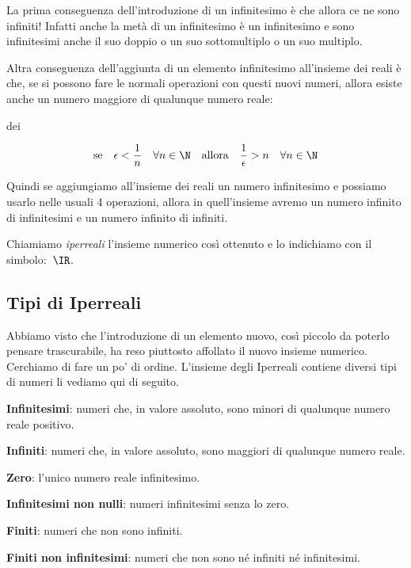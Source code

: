 La prima conseguenza dell'introduzione di un infinitesimo è che allora ce 
ne sono infiniti! 
Infatti anche la metà di un infinitesimo è un infinitesimo e 
sono infinitesimi anche il suo doppio o un suo sottomultiplo o un suo 
multiplo.

Altra conseguenza dell'aggiunta di un elemento infinitesimo all'insieme dei 
reali è che, se si possono fare le normali operazioni con questi nuovi 
numeri, allora esiste anche un numero maggiore di qualunque numero reale:

dei 

\[\text{se} \quad \epsilon < \frac{1}{n} \quad \forall n \in \N 
\quad \text{allora} \quad \frac{1}{\epsilon} > n \quad \forall n 
\in \N\]

Quindi se aggiungiamo all'insieme dei reali un numero infinitesimo e 
possiamo 
usarlo nelle usuali 4 operazioni, allora in quell'insieme avremo un 
numero infinito di infinitesimi e un numero infinito di infiniti.

Chiamiamo \emph{iperreali} l'insieme numerico così ottenuto e lo indichiamo 
con il simbolo:~$\IR$.

\subsection{Tipi di Iperreali}
\label{subsec:insnum_iperreali}

Abbiamo visto che l'introduzione di un elemento nuovo, così piccolo
da poterlo pensare trascurabile, ha reso piuttosto affollato il nuovo 
insieme numerico. 
Cerchiamo di fare un po' di ordine. 
L'insieme degli Iperreali contiene diversi tipi di numeri li vediamo qui di 
seguito.

\begin{description} [noitemsep]
 \item \textbf{Infinitesimi}:
numeri che, in valore assoluto, sono minori di qualunque numero reale 
positivo.
 \item \textbf{Infiniti}:
numeri che, in valore assoluto, sono maggiori di qualunque numero reale.
 \item \textbf{Zero}:
l'unico numero reale infinitesimo.
 \item \textbf{Infinitesimi non nulli}:
numeri infinitesimi senza lo zero.
 \item \textbf{Finiti}:
numeri che non sono infiniti.
 \item \textbf{Finiti non infinitesimi}:
numeri che non sono né infiniti né infinitesimi.
\end{description}

